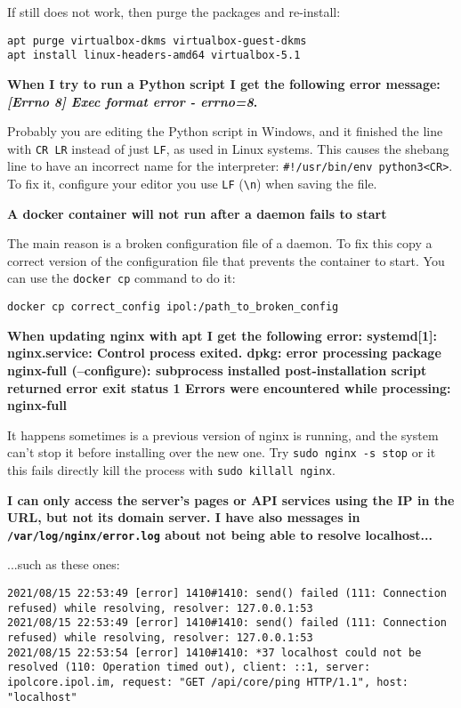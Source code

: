\documentclass[a4paper,12pt]{article}
\begin{document}
If still does not work, then purge the packages and re-install:

\begin{verbatim}
apt purge virtualbox-dkms virtualbox-guest-dkms
apt install linux-headers-amd64 virtualbox-5.1
\end{verbatim}
\vspace{0.5cm}

\textbf{When I try to run a Python script I get the following error message: \emph{[Errno 8] Exec format error - errno=8}.}

Probably you are editing the Python script in Windows, and it finished the line with {\tt CR LR} instead of just {\tt LF}, as used in Linux systems. This causes the shebang line to have an incorrect name for the interpreter: {\tt \#!/usr/bin/env python3<CR>}. To fix it, configure your editor you use {\tt LF} ({\tt \textbackslash n}) when saving the file.
\vspace{0.5cm}

\textbf{A docker container will not run after a daemon fails to start}

The main reason is a broken configuration file of a daemon. To fix this copy a correct version of the configuration file that prevents the container to start. You can use the {\tt docker cp} command to do it:

\begin{verbatim}
docker cp correct_config ipol:/path_to_broken_config
\end{verbatim}

\textbf{When updating nginx with apt I get the following error: systemd[1]: nginx.service: Control process exited. dpkg: error processing package nginx-full (--configure):  subprocess installed post-installation script returned error exit status 1 Errors were encountered while processing:  nginx-full}

It happens sometimes is a previous version of nginx is running, and the system can't stop it before installing over the new one. Try {\tt sudo nginx -s stop} or it this fails directly kill the process with {\tt sudo killall nginx}.
\vspace{0.5cm}

\textbf{I can only access the server's pages or API services using the IP in the URL, but not its domain server. I have also messages in {\tt /var/log/nginx/error.log} about not being able to resolve localhost...}

...such as these ones:
\begin{verbatim}
2021/08/15 22:53:49 [error] 1410#1410: send() failed (111: Connection refused) while resolving, resolver: 127.0.0.1:53
2021/08/15 22:53:49 [error] 1410#1410: send() failed (111: Connection refused) while resolving, resolver: 127.0.0.1:53
2021/08/15 22:53:54 [error] 1410#1410: *37 localhost could not be resolved (110: Operation timed out), client: ::1, server: ipolcore.ipol.im, request: "GET /api/core/ping HTTP/1.1", host: "localhost"
\end{verbatim}
\end{document}
